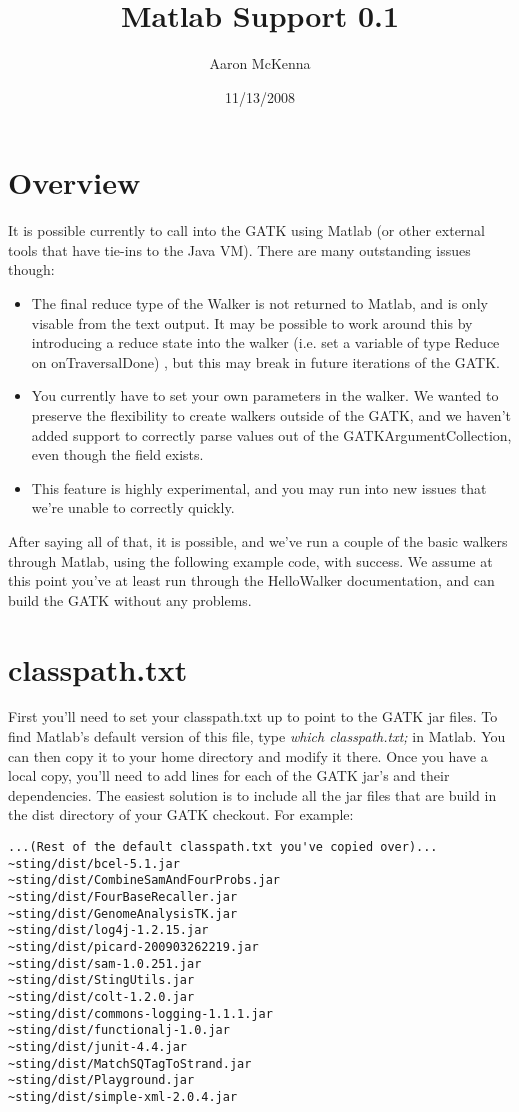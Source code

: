 \documentclass[11pt]{article}
\begin{document}
\title{Matlab Support 0.1}
\author{Aaron McKenna}
\date{11/13/2008}
\section{Overview}
It is possible currently to call into the GATK using Matlab (or other external tools that have tie-ins to the Java VM).  
There are many outstanding issues though:
\begin{itemize}
\item The final reduce type of the Walker is not returned to Matlab, and is only visable from the text output.  It may be possible to work around this by introducing a reduce state into the walker (i.e. set a variable of type Reduce on onTraversalDone) , but this may break in future iterations of the GATK.
\item You currently have to set your own parameters in the walker.  We wanted to preserve the flexibility to create walkers outside of the GATK, and we haven't added support to correctly parse values out of the GATKArgumentCollection, even though the field exists.
\item This feature is highly experimental, and you may run into new issues that we're unable to correctly quickly.  
\end{itemize}
After saying all of that, it is possible, and we've run a couple of the basic walkers through Matlab, using the following example code,  with success.  We assume at this point you've at least run through the HelloWalker documentation, and can build the GATK without any problems.
\section{classpath.txt}
First you'll need to set your classpath.txt up to point to the GATK jar files.  To find Matlab's default version of this file, type \textit{which classpath.txt;} in Matlab.  You can then copy it to your home directory and modify it there.  Once you have a local copy, you'll need to add lines for each of the GATK jar's and their dependencies.  The easiest solution is to include all the jar files that are build in the dist directory of your GATK checkout.  For example:
\pagebreak
\lstset{caption=classpath.txt example, frame=lines, label=MthodNames,basicstyle= \tiny}
\lstset{tabsize=4}
\begin{lstlisting}
...(Rest of the default classpath.txt you've copied over)...
~sting/dist/bcel-5.1.jar    
~sting/dist/CombineSamAndFourProbs.jar
~sting/dist/FourBaseRecaller.jar  
~sting/dist/GenomeAnalysisTK.jar  
~sting/dist/log4j-1.2.15.jar        
~sting/dist/picard-200903262219.jar  
~sting/dist/sam-1.0.251.jar       
~sting/dist/StingUtils.jar
~sting/dist/colt-1.2.0.jar  
~sting/dist/commons-logging-1.1.1.jar   
~sting/dist/functionalj-1.0.jar   
~sting/dist/junit-4.4.jar         
~sting/dist/MatchSQTagToStrand.jar  
~sting/dist/Playground.jar           
~sting/dist/simple-xml-2.0.4.jar
\end{lstlisting}
\pagebreak
\end{document}
